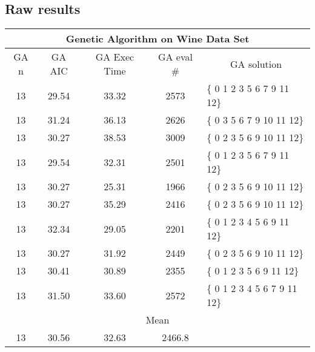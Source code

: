 \subsection{Raw results}
\label{rawResWine}
\begin{tabular}{|c|c|c|c|l|}
	\hline
	\multicolumn{5}{|c|}{Genetic Algorithm on Wine Data Set}                                          \\ \hline
	GA n & GA AIC      & GA Exec Time & GA eval \# & \multicolumn{1}{c|}{GA solution} \\ \hline
	13   & 29.54 & 33.32            & 2573                  & \{ 0 1 2 3 5 6 7 9 11 12\}       \\ \hline
	13   & 31.24  & 36.13            & 2626                  & \{ 0 3 5 6 7 9 10 11 12\}        \\ \hline
	13   & 30.27 & 38.53            & 3009                  & \{ 0 2 3 5 6 9 10 11 12\}        \\ \hline
	13   & 29.54 & 32.31            & 2501                  & \{ 0 1 2 3 5 6 7 9 11 12\}       \\ \hline
	13   & 30.27 & 25.31            & 1966                  & \{ 0 2 3 5 6 9 10 11 12\}        \\ \hline
	13   & 30.27 & 35.29            & 2416                  & \{ 0 2 3 5 6 9 10 11 12\}        \\ \hline
	13   & 32.34 & 29.05            & 2201                  & \{ 0 1 2 3 4 5 6 9 11 12\}       \\ \hline
	13   & 30.27 & 31.92            & 2449                  & \{ 0 2 3 5 6 9 10 11 12\}        \\ \hline
	13   & 30.41 & 30.89            & 2355                  & \{ 0 1 2 3 5 6 9 11 12\}         \\ \hline
	13   & 31.50 & 33.60            & 2572                  & \{ 0 1 2 3 4 5 6 7 9 11 12\}     \\ \hline
	\multicolumn{5}{|c|}{Mean}                                                                        \\ \hline
	13   & 30.56 & 32.63           & 2466.8                &                                  \\ \hline
\end{tabular}

